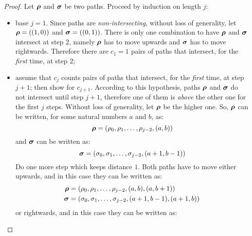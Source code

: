 \begin{proof}
    Let $\boldsymbol{\rho}$ and $\boldsymbol{\sigma}$ be two paths. Proceed by 
    induction on length $j$:
    \begin{itemize}
        \item base $j=1$. Since paths are \emph{non-intersecting}, without loss
            of generality, let $\boldsymbol{\rho}=((1,0))$ and $\boldsymbol{\sigma}=((0,1))$.
            There is only one combination to have $\boldsymbol{\rho}$ and $\boldsymbol{\sigma}$
            intersect at step $2$, namely $\boldsymbol{\rho}$ has to move upwards and
            $\boldsymbol{\sigma}$ has to move rightwards. Therefore there are $c_{1}=1$ pairs
            of paths that intersect, for the \emph{first} time, at step $2$; 
        \item assume that $c_j$ counts pairs of paths that intersect, 
            for the \emph{first} time, at step $j+1$; then show for $c_{j+1}$. 
            According to this hypothesis, paths $\boldsymbol{\rho}$ and $\boldsymbol{\sigma}$ 
            do not intersect until step $j+1$, therefore one of them is \emph{above}
            the other one for the first $j$ steps. 
            Without loss of generality, let $\boldsymbol{\rho}$ be the higher one. So, 
            $\boldsymbol{\rho}$ can be written, for some natural numbers $a$ and $b$, as:
            \begin{displaymath}
                \boldsymbol{\rho}=(\rho_{0},\rho_{1},\ldots,\rho_{j-2},(a, b))
            \end{displaymath}
            and $\boldsymbol{\sigma}$ can be written as:
            \begin{displaymath}
                \boldsymbol{\sigma}=(\sigma_{0},\sigma_{1},\ldots,\sigma_{j-2},(a+1, b-1))
            \end{displaymath}
            Do one more step which keeps distance $1$. Both paths have to move
            either upwards, and in this case they can be written as:
            \begin{displaymath}
                \begin{split}
                    \boldsymbol{\rho}&=(\rho_{0},\rho_{1},\ldots,\rho_{j-2},(a, b),(a, b+1))\\
                    \boldsymbol{\sigma}&=(\sigma_{0},\sigma_{1},\ldots,\sigma_{j-2},(a+1,b-1), (a+1, b))
                \end{split}
            \end{displaymath}
            or rightwards, and in this case they can be written as:
            \begin{displaymath}

\end{displaymath}
\end{itemize}
\end{proof}
